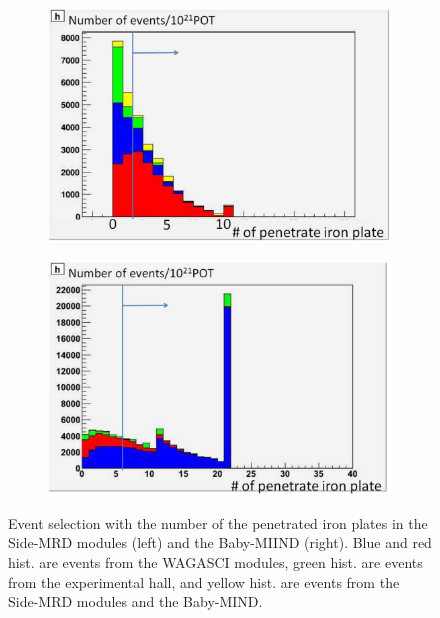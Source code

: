\begin{figure}[tbh]
  \begin{center}
   \begin{subfigure}{0.48\textwidth}
     \includegraphics[width=\linewidth]{fig/penetrated_iron_plates_cut_sidemrd.pdf}
    \end{subfigure}
  \begin{subfigure}{0.48\textwidth}
      \includegraphics[width=\linewidth]{fig/penetrated_iron_plates_cut_babymind.pdf}
    \end{subfigure}    
    \end{center}
  \caption{
Event selection with the number of the penetrated iron plates in the Side-MRD modules (left) and the Baby-MIIND (right).
Blue and red hist. are events from the WAGASCI modules, green hist. are events from the experimental hall, and yellow hist. are events from the Side-MRD modules and the Baby-MIND.
}
\label{fig:penetrated_iron_plates_cut}
\end{figure}


